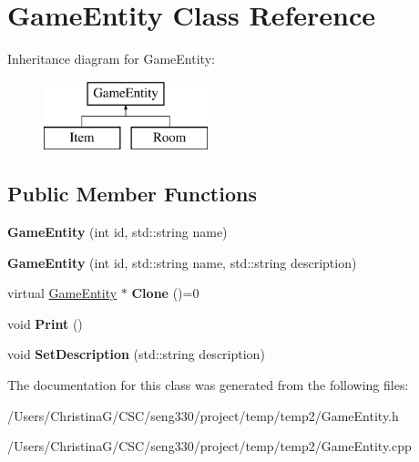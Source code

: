 \hypertarget{class_game_entity}{}\section{Game\+Entity Class Reference}
\label{class_game_entity}
Inheritance diagram for Game\+Entity\+:\begin{figure}[H]
\begin{center}
\leavevmode
\includegraphics[height=2.000000cm]{class_game_entity}
\end{center}
\end{figure}
\subsection*{Public Member Functions}
\begin{DoxyCompactItemize}
\item 
\hypertarget{class_game_entity_ac534073fe3e7b25d95029c8af622a88e}{}{\bfseries Game\+Entity} (int id, std\+::string name)\label{class_game_entity_ac534073fe3e7b25d95029c8af622a88e}

\item 
\hypertarget{class_game_entity_a941b5c3c653f7526545bd81816e9531a}{}{\bfseries Game\+Entity} (int id, std\+::string name, std\+::string description)\label{class_game_entity_a941b5c3c653f7526545bd81816e9531a}

\item 
\hypertarget{class_game_entity_a0effae7533a6e242c71a5ccd2bb5a030}{}virtual \hyperlink{class_game_entity}{Game\+Entity} $\ast$ {\bfseries Clone} ()=0\label{class_game_entity_a0effae7533a6e242c71a5ccd2bb5a030}

\item 
\hypertarget{class_game_entity_ac909a518389ee9bc92562b4166340766}{}void {\bfseries Print} ()\label{class_game_entity_ac909a518389ee9bc92562b4166340766}

\item 
\hypertarget{class_game_entity_a163f5785614921a65aab161491d8c47c}{}void {\bfseries Set\+Description} (std\+::string description)\label{class_game_entity_a163f5785614921a65aab161491d8c47c}

\end{DoxyCompactItemize}


The documentation for this class was generated from the following files\+:\begin{DoxyCompactItemize}
\item 
/\+Users/\+Christina\+G/\+C\+S\+C/seng330/project/temp/temp2/Game\+Entity.\+h\item 
/\+Users/\+Christina\+G/\+C\+S\+C/seng330/project/temp/temp2/Game\+Entity.\+cpp\end{DoxyCompactItemize}
